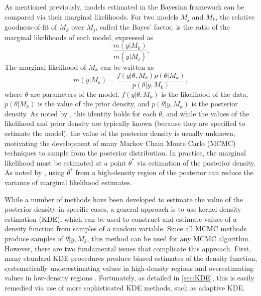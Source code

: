 \documentclass[twocolumn]{article}
\begin{document}
As mentioned previously, models estimated in the Bayesian framework can be compared via their marginal likelihoods. For two models $M_j$ and $M_k$, the relative goodness-of-fit of $M_k$ over $M_j$, called the Bayes' factor, is the ratio of the marginal likelihoods of each model, expressed as
\begin{equation}
	\frac{m(y|M_k)}{m(y|M_j)}.
\end{equation}
The marginal likelihood of $M_k$ can be written as
\begin{equation}
	m(y|M_k) = \frac{f(y|\theta, M_k)p(\theta|M_k)}{p(\theta|y, M_k)},
\end{equation}
where $\theta$ are parameters of the model, $f(y|\theta, M_k)$ is the likelihood of the data, $p(\theta|M_k)$ is the value of the prior density, and $p(\theta|y, M_k)$ is the posterior density. As noted by \cite{Chib}, this identity holds for each $\theta$, and while the values of the likelihood and prior density are typically known (because they are specified to estimate the model), the value of the posterior density is usually unknown, motivating the development of many Markov Chain Monte Carlo (MCMC) techniques to sample from the posterior distribution. In practice, the marginal likelihood must be estimated at a point $\theta^*$ via estimation of the posterior density. As noted by \cite{Chib}, using $\theta^*$ from a high-density region of the posterior can reduce the variance of marginal likelihood estimates.

While a number of methods have been developed to estimate the value of the posterior density in specific cases, a general approach is to use kernel density estimation (KDE), which can be used to construct and estimate values of a density function from samples of a random variable. Since all MCMC methods produce samples of $\theta|y, M_k$, this method can be used for any MCMC algorithm. However, there are two fundamental issues that complicate this approach. First, many standard KDE procedures produce biased estimates of the density function, systematically underestimating values in high-density regions and overestimating values in low-density regions \citep{SilvermanDE}. Fortunately, as detailed in \cref{sec:KDE}, this is easily remedied via use of more sophisticated KDE methods, such as adaptive KDE.
\end{document}
